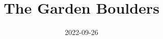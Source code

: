 \documentclass[10pt]{report}
\begin{document}
\title{The Garden Boulders}
\date{2022-09-26}
\maketitle

\newcommand\chapterColor{MidnightBlue}

\renewcommand\chapterColor{BrickRed}

\renewcommand\chapterColor{BurntOrange}

\renewcommand\chapterColor{PineGreen}

\renewcommand\chapterColor{RoyalPurple}

\renewcommand\chapterColor{Aquamarine}
\renewcommand\chapterColor{MidnightBlue}

\end{document}

